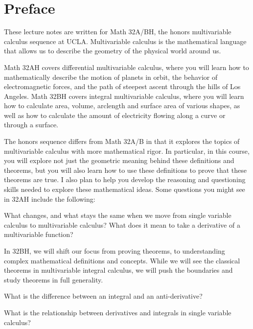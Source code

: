 \documentclass{wongtreebook}
\begin{document}
\chapter{Preface}
These lecture notes are written for Math 32A/BH, the honors multivariable calculus sequence at UCLA.  Multivariable calculus is the mathematical language that allows us to describe the geometry of the physical world around us.

Math 32AH covers differential multivariable calculus, where you will learn how to mathematically describe the motion of planets in orbit, the behavior of electromagnetic forces, and the path of steepest ascent through the hills of Los Angeles. Math 32BH covers integral multivariable calculus, where you will learn how to calculate area, volume, arclength and surface area of various shapes, as well as how to calculate the amount of electricity flowing along a curve or through a surface.


The honors sequence differs from Math 32A/B in that it explores the topics of multivariable calculus with more mathematical rigor.  In particular, in this course, you will explore not just the geometric meaning behind these definitions and theorems, but you will also learn how to use these definitions to prove that these theorems are true.  I also plan to help you develop the reasoning and questioning skills needed to explore these mathematical ideas.  Some questions you might see in 32AH include the following:

\begin{motivating}
What changes, and what stays the same when we move from single variable calculus to multivariable calculus?  What does it mean to take a derivative of a multivariable function?
\end{motivating}

In 32BH, we will shift our focus from proving theorems, to understanding complex mathematical definitions and concepts.  While we will see the classical theorems in multivariable integral calculus, we will push the boundaries and study theorems in full generality.





    \begin{motivating}
    What is the difference between an integral and an anti-derivative?  
    \end{motivating}
    
    \begin{motivating}
    What is the relationship between derivatives and integrals in single variable calculus?
    \end{motivating}
\end{document}
